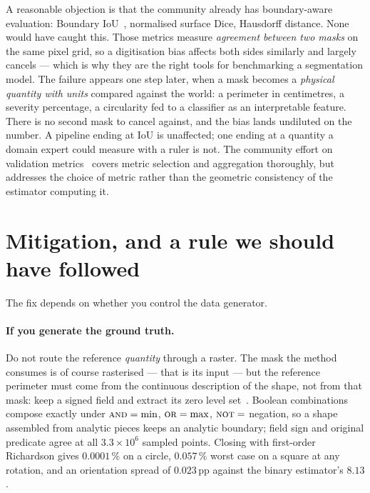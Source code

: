 \documentclass{article}
\newcommand{\pct}[1]{$#1\,\%$}
\begin{document}
A reasonable objection is that the community already has boundary-aware evaluation: Boundary
IoU~\citep{cheng2021}, normalised surface Dice, Hausdorff distance. None would have caught this.
Those metrics measure \emph{agreement between two masks} on the same pixel grid, so a digitisation
bias affects both sides similarly and largely cancels --- which is why they are the right tools for
benchmarking a segmentation model. The failure appears one step later, when a mask becomes a
\emph{physical quantity with units} compared against the world: a perimeter in centimetres, a
severity percentage, a circularity fed to a classifier as an interpretable feature. There is no
second mask to cancel against, and the bias lands undiluted on the number. A pipeline ending at IoU
is unaffected; one ending at a quantity a domain expert could measure with a ruler is not. The
community effort on validation metrics~\citep{maierhein2024,reinke2024} covers metric selection and
aggregation thoroughly, but addresses the choice of metric rather than the geometric consistency of
the estimator computing it.

\section{Mitigation, and a rule we should have followed}
\label{sec:fix}

The fix depends on whether you control the data generator.

\paragraph{If you generate the ground truth.} Do not route the reference \emph{quantity} through a
raster. The mask the method consumes is of course rasterised --- that is its input --- but the
reference perimeter must come from the continuous description of the shape, not from that mask:
keep a signed field and extract its zero level set~\citep{osher1988}. Boolean combinations compose exactly under
$\textsc{and}=\min$, $\textsc{or}=\max$, $\textsc{not}=$ negation, so a shape assembled from
analytic pieces keeps an analytic boundary; field sign and original predicate agree at all
$3.3\times10^6$ sampled points. Closing with first-order Richardson gives \pct{0.0001} on a
circle, \pct{0.057} worst case on a square at any rotation, and an orientation spread of
$0.023$\,pp against the binary estimator's $8.13$.
\end{document}

